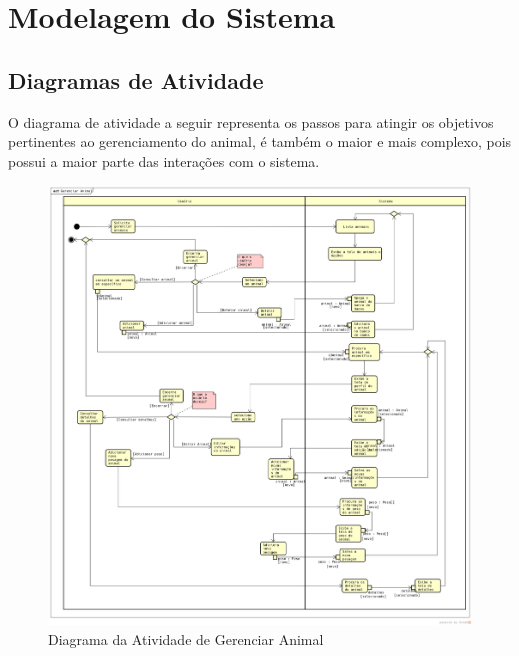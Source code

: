 \documentclass[12pt]{article}
\begin{document}
\newpage
\section{Modelagem do Sistema}

\subsection{Diagramas de Atividade}

O diagrama de atividade a seguir representa os passos para atingir os objetivos pertinentes ao gerenciamento do animal, é também o maior e mais complexo, pois possui a maior parte das interações com o sistema.

\begin{figure}[!h]
	\begin{center}
		\caption{Diagrama da Atividade de Gerenciar Animal}
		\includegraphics[width=6in]{img/atividadeanimal.png}

	\end{center}
\end{figure}

\newpage
\end{document}
